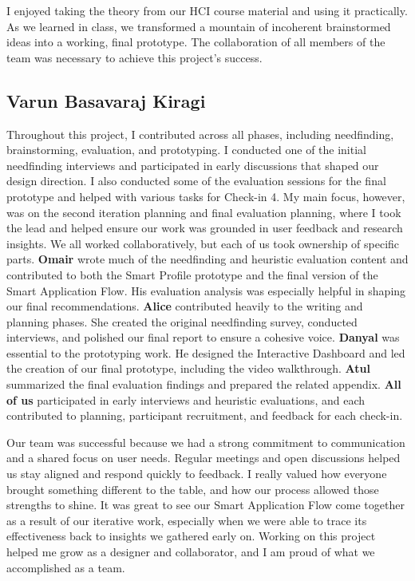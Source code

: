 \documentclass[
	letterpaper, %
]{jdf}
\begin{document}
\begin{sloppypar}
I enjoyed taking the theory from our HCI course material and using it practically. As we learned in class, we transformed a mountain of incoherent brainstormed ideas into a working, final prototype. The collaboration of all members of the team was necessary to achieve this project’s success.


\newpage

\subsection{Varun Basavaraj Kiragi}
Throughout this project, I contributed across all phases, including needfinding, brainstorming, evaluation, and prototyping. I conducted one of the initial needfinding interviews and participated in early discussions that shaped our design direction. I also conducted some of the evaluation sessions for the final prototype and helped with various tasks for Check-in 4. My main focus, however, was on the second iteration planning and final evaluation planning, where I took the lead and helped ensure our work was grounded in user feedback and research insights.
We all worked collaboratively, but each of us took ownership of specific parts. \textbf{Omair} wrote much of the needfinding and heuristic evaluation content and contributed to both the Smart Profile prototype and the final version of the Smart Application Flow. His evaluation analysis was especially helpful in shaping our final recommendations. \textbf{Alice} contributed heavily to the writing and planning phases. She created the original needfinding survey, conducted interviews, and polished our final report to ensure a cohesive voice. \textbf{Danyal} was essential to the prototyping work. He designed the Interactive Dashboard and led the creation of our final prototype, including the video walkthrough. \textbf{Atul} summarized the final evaluation findings and prepared the related appendix. \textbf{All of us} participated in early interviews and heuristic evaluations, and each contributed to planning, participant recruitment, and feedback for each check-in.

Our team was successful because we had a strong commitment to communication and a shared focus on user needs. Regular meetings and open discussions helped us stay aligned and respond quickly to feedback. I really valued how everyone brought something different to the table, and how our process allowed those strengths to shine. It was great to see our Smart Application Flow come together as a result of our iterative work, especially when we were able to trace its effectiveness back to insights we gathered early on. Working on this project helped me grow as a designer and collaborator, and I am proud of what we accomplished as a team.
\newpage


\end{sloppypar}
\end{document}
